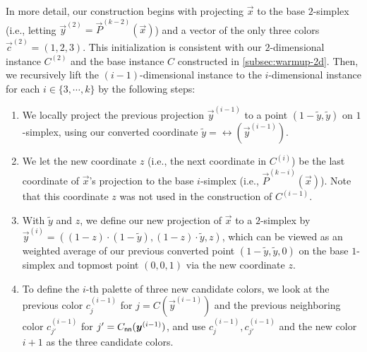 In more detail,
our construction begins with projecting $\vec{x}$ to the base $2$-simplex (i.e., letting $\vec{y}^{(2)}=\vec{P}^{(k-2)}(\vec{x})$) and a vector of the only three colors $\vec{c}^{(2)}=(1,2,3)$. 
This initialization is consistent with our $2$-dimensional instance $C^{(2)}$ and the base instance $C$ constructed in \cref{subsec:warmup-2d}.
Then, we recursively lift the $(i-1)$-dimensional instance to the $i$-dimensional instance for each $i\in \{3,\cdots, k\}$ by the following steps:
\begin{enumerate}[itemsep=0.2em, topsep=0.5em]
    \item We locally project the previous projection $\vec{y}^{(i-1)}$ to a point $(1-\tilde{y},\tilde{y})$ on $1$-simplex, using our converted coordinate $\tilde{y}=\rel(\vec{y}^{(i-1)})$. 
    \item We let the new coordinate $z$ (i.e., the next coordinate in $C^{(i)}$) be the last coordinate of $\vec{x}$'s projection to the base $i$-simplex (i.e., $\vec{P}^{(k-i)}(\vec{x})$). 
    Note that this coordinate $z$ was not used in the construction of $C^{(i-1)}$.
    \item With $\tilde{y}$ and $z$, we define our new projection of $\vec{x}$ to a $2$-simplex by $\vec{y}^{(i)}=((1-z)\cdot (1-\tilde{y}), (1-z)\cdot \tilde{y}, z)$, which can be viewed as an weighted average of our previous converted point $(1-\tilde{y}, \tilde{y}, 0)$ on the base $1$-simplex and topmost point $(0,0,1)$ via the new coordinate $z$.
    \item To define the $i$-th palette of three new candidate colors, we look at the previous color $c^{(i-1)}_j$ for $j=C(\vec{y}^{(i-1)})$ and the previous neighboring color $c^{(i-1)}_{j'}$ for $j'=C_{\sf nn}(\vec{y}^{(i-1)})$, and use $c^{(i-1)}_{j}, c^{(i-1)}_{j'}$ and the new color $i+1$ as the three candidate colors. 
\end{enumerate}


